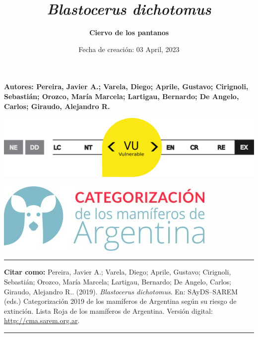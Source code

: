 \documentclass[
]{article}
\title{\emph{Blastocerus dichotomus}}
\subtitle{\textbf{Ciervo de los pantanos}}
\author{}
\date{\vspace{-2.5em}Fecha de creación: 03 April, 2023}
\begin{document}
\maketitle


\center

\textbf{Autores: Pereira, Javier A.; Varela, Diego; Aprile, Gustavo;
Cirignoli, Sebastián; Orozco, María Marcela; Lartigau, Bernardo; De
Angelo, Carlos; Giraudo, Alejandro R.}

\begin{center}\includegraphics[width=0.7\linewidth]{images/scale-vu} \end{center}

\begin{center}\includegraphics[width=0.7\linewidth]{images/cma-logo} \end{center}

\begin{center}\rule{0.5\linewidth}{0.5pt}\end{center}

\justifying

\textbf{Citar como:} Pereira, Javier A.; Varela, Diego; Aprile, Gustavo;
Cirignoli, Sebastián; Orozco, María Marcela; Lartigau, Bernardo; De
Angelo, Carlos; Giraudo, Alejandro R.. (2019). \emph{Blastocerus
dichotomus}. En: SAyDS--SAREM (eds.) Categorización 2019 de los
mamíferos de Argentina según su riesgo de extinción. Lista Roja de los
mamíferos de Argentina. Versión digital: \url{http://cma.sarem.org.ar}.

\begin{center}\rule{0.5\linewidth}{0.5pt}\end{center}

\newpage
\end{document}

